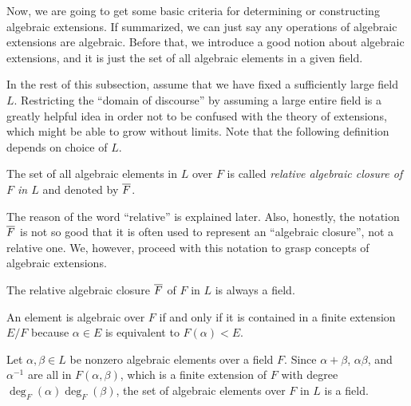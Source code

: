 \documentclass{../exp}
\begin{document}
Now, we are going to get some basic criteria for determining or constructing algebraic extensions.
If summarized, we can just say any operations of algebraic extensions are algebraic.
Before that, we introduce a good notion about algebraic extensions, and it is just the set of all algebraic elements in a given field.

In the rest of this subsection, assume that we have fixed a sufficiently large field $L$.
Restricting the ``domain of discourse'' by assuming a large entire field is a greatly helpful idea in order not to be confused with the theory of extensions, which might be able to grow without limits.
Note that the following definition depends on choice of $L$.
\begin{defn}
The set of all algebraic elements in $L$ over $F$ is called \emph{relative algebraic closure of $F$ in $L$} and denoted by $\overline F$.
\end{defn}
\begin{rmk}
The reason of the word ``relative'' is explained later.
Also, honestly, the notation $\overline F$ is not so good that it is often used to represent an ``algebraic closure'', not a relative one.
We, however, proceed with this notation to grasp concepts of algebraic extensions.
\end{rmk}
\begin{prop}
The relative algebraic closure $\overline F$ of $F$ in $L$ is always a field.
\end{prop}
\begin{pf}
An element is algebraic over $F$ if and only if it is contained in a finite extension $E/F$ because $\alpha\in E$ is equivalent to $F(\alpha)<E$.

Let $\alpha,\beta\in L$ be nonzero algebraic elements over a field $F$.
Since $\alpha+\beta$, $\alpha\beta$, and $\alpha^{-1}$ are all in $F(\alpha,\beta)$, which is a finite extension of $F$ with degree $\deg_F(\alpha)\deg_F(\beta)$, the set of algebraic elements over $F$ in $L$ is a field.
\end{pf}
\end{document}
